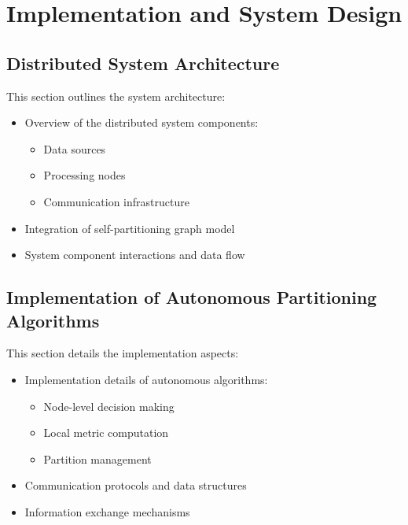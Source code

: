 \chapter{Implementation and System Design}

\section{Distributed System Architecture}
This section outlines the system architecture:
\begin{itemize}
    \item Overview of the distributed system components:
        \begin{itemize}
            \item Data sources
            \item Processing nodes
            \item Communication infrastructure
        \end{itemize}
    \item Integration of self-partitioning graph model
    \item System component interactions and data flow
\end{itemize}

\section{Implementation of Autonomous Partitioning Algorithms}
This section details the implementation aspects:
\begin{itemize}
    \item Implementation details of autonomous algorithms:
        \begin{itemize}
            \item Node-level decision making
            \item Local metric computation
            \item Partition management
        \end{itemize}
    \item Communication protocols and data structures
    \item Information exchange mechanisms
\end{itemize}

